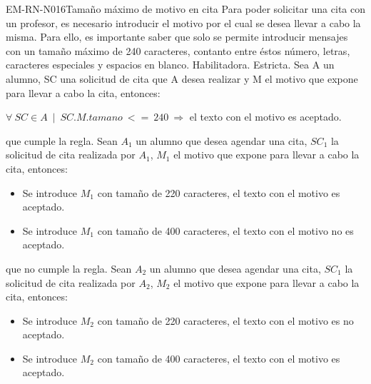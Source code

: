 \begin{BussinesRule}{EM-RN-N016}{Tamaño máximo de motivo en cita}
	\BRitem[Descripción:] Para poder solicitar una cita con un profesor, es necesario introducir el motivo por el cual se desea llevar a cabo la misma. Para ello, es importante saber que solo se permite introducir mensajes con un tamaño máximo de 240 caracteres, contanto entre éstos número, letras, caracteres especiales y espacios en blanco.  
	\BRitem[Tipo: ] Habilitadora.
	\BRitem[Nivel: ] Estricta.
	\BRitem[Sentenia: ] Sea A un alumno, SC una solicitud de cita que A desea realizar y M el motivo que expone para llevar a cabo la cita, entonces:
	\begin{center}
		$\forall \: SC \in A \: \mid \: SC.M.tamano \: <= \: 240 \: \Rightarrow$ el texto con el motivo es aceptado.
	\end{center}
	 que cumple la regla.
		Sean $A_{1}$ un alumno que desea agendar una cita, $SC_{1}$ la solicitud de cita realizada por $A_{1}$, $M_{1}$ el motivo que expone para llevar a cabo la cita, entonces:
		\begin{itemize}
			\item Se introduce $M_{1}$ con tamaño de 220 caracteres, el texto con el motivo es aceptado.
			\item Se introduce $M_{1}$ con tamaño de 400 caracteres, el texto con el motivo no es aceptado.
		\end{itemize}
	 que no cumple la regla.
		Sean $A_{2}$ un alumno que desea agendar una cita, $SC_{1}$ la solicitud de cita realizada por $A_{2}$, $M_{2}$ el motivo que expone para llevar a cabo la cita, entonces:
		\begin{itemize}
			\item Se introduce $M_{2}$ con tamaño de 220 caracteres, el texto con el motivo es no aceptado.
			\item Se introduce $M_{2}$ con tamaño de 400 caracteres, el texto con el motivo es aceptado.
		\end{itemize}

\end{BussinesRule}


